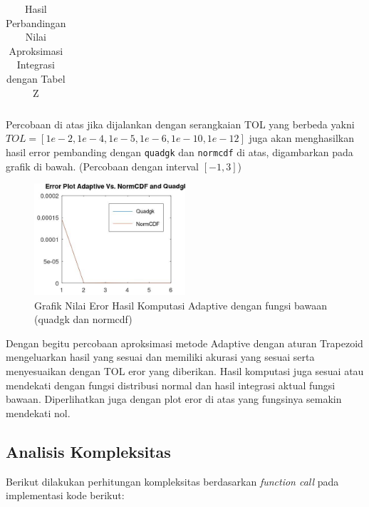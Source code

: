 \documentclass[journal,12pt,onecolumn,a4paper]{IEEEtran}
\begin{document}
\begin{enumerate}
\begin{center}
\begin{table}[H]
\begin{tabular}{cccccc}
				      \bottomrule %
			      \end{tabular}
			      \smallskip
			      \caption{Hasil Perbandingan Nilai Aproksimasi Integrasi dengan Tabel Z} %
			      \label{tab: template} %
		      \end{table}
	      \end{center}
\end{enumerate}

Percobaan di atas jika dijalankan dengan serangkaian TOL yang berbeda yakni \(TOL = [1e-2,1e-4,1e-5, 1e-6, 1e-10, 1e-12]\) juga akan menghasilkan hasil error pembanding dengan \lstinline{quadgk} dan \lstinline{normcdf} di atas, digambarkan pada grafik di bawah.
(Percobaan dengan interval \([-1,3]\))

\begin{figure}[h]
	\centering
	\includegraphics[width=0.5\textwidth]{bagus_adaptive.jpg}
	\caption{Grafik Nilai Eror Hasil Komputasi Adaptive dengan fungsi bawaan (quadgk dan normcdf)}
	\label{fig:difGraphAdaptive}
\end{figure}

Dengan begitu percobaan aproksimasi metode Adaptive dengan aturan Trapezoid mengeluarkan hasil yang sesuai dan memiliki akurasi yang sesuai serta menyesuaikan dengan TOL eror yang diberikan. Hasil komputasi juga sesuai atau mendekati dengan fungsi distribusi normal dan hasil integrasi aktual fungsi bawaan. Diperlihatkan juga dengan plot eror di atas yang fungsinya semakin mendekati nol.

\subsection{Analisis Kompleksitas}
Berikut dilakukan perhitungan kompleksitas berdasarkan \emph{function call} pada implementasi kode berikut:
\end{document}
